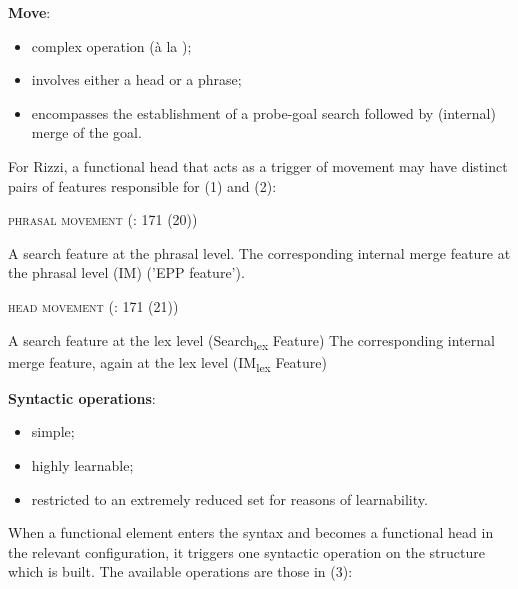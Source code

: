 \documentclass[fleqn,10pt]{wlscirep}
\begin{document}
\noindent\textbf{Move}: 
\begin{itemize}
    \item[\ding{227}] \vspace*{-2mm} complex operation (à la \citealt{chomsky2001});
    \item[\ding{227}] \vspace*{-2mm} involves either a head or a phrase;
    \item[\ding{227}] \vspace*{-2mm} encompasses the establishment of a probe-goal search followed by (internal) merge of the goal. 
\end{itemize}

For Rizzi, a functional head that acts as a trigger of movement may have distinct pairs of features responsible for (1) and (2):

\begin{exe}
    \ex \textsc{phrasal movement} (\citealt{rizzi2017}: 171 (20))
        \begin{xlist}
            \ex A search feature at the phrasal level.
            \ex The corresponding internal merge feature at the phrasal level (IM) ('EPP feature').
        \end{xlist}
\end{exe}

\begin{exe}
    \ex \textsc{head movement} (\citealt{rizzi2017}: 171 (21)) 
        \begin{xlist}
            \ex A search feature at the lex level (Search\textsubscript{lex} Feature)
            \ex The corresponding internal merge feature, again at the lex level (IM\textsubscript{lex} Feature)
        \end{xlist}
\end{exe}

\noindent\textbf{Syntactic operations}: 
\begin{itemize}
    \item[\ding{227}] \vspace*{-2mm} simple;
    \item[\ding{227}] \vspace*{-2mm} highly learnable;
    \item[\ding{227}] \vspace*{-2mm} restricted to an extremely reduced set for reasons of learnability.
\end{itemize}	

\noindent When a functional element enters the syntax and becomes a functional head in the relevant configuration, it triggers one syntactic operation on the structure which is built. The available operations are those in (3):
\end{document}
